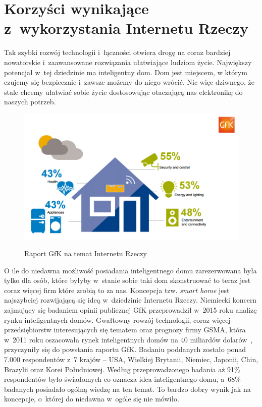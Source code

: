 \documentclass{xmgr}
\begin{document}
\section{Korzyści wynikające z~wykorzystania Internetu Rzeczy}
	Tak szybki rozwój technologii i~łączności otwiera drogę na coraz bardziej nowatorskie i~zaawansowane rozwiązania ułatwiające ludziom życie. Największy potencjał w~tej dziedzinie ma inteligentny dom. Dom jest miejscem, w którym czujemy się bezpiecznie i~zawsze możemy do niego wrócić. Nic więc dziwnego, że stale chcemy ułatwiać sobie życie dostosowując otaczającą nas elektronikę do naszych potrzeb.
\begin{figure}[h]
\centering
\includegraphics[width=\textwidth]{m_percent}
\label{fig:gfk}
\caption{Raport GfK na temat Internetu Rzeczy}
\end{figure} 
	O ile do niedawna możliwość posiadania inteligentnego domu zarezerwowana była tylko dla osób, które byłyby w~stanie sobie taki dom skonstruować to teraz jest coraz więcej firm które zrobią to za nas. Koncepcja tzw. \emph{smart home} jest najszybciej rozwijającą się ideą w~dziedzinie Internetu Rzeczy. Niemiecki koncern zajmujący się badaniem opinii publicznej GfK przeprowadził w~2015 roku analizę rynku inteligentnych domów. Gwałtowny rowzój technologii, coraz więcej przedsiębiorstw interesujących się tematem oraz prognozy firmy GSMA, która w~2011 roku oszacowała rynek inteligentnych domów na 40 miliardów dolarów~\cite{Gsma:2011:CMC}, przyczyniły się do powstania raportu GfK. Badaniu poddanych zostało ponad 7.000 respondentów z~7 krajów – USA, Wielkiej Brytanii, Niemiec, Japonii, Chin, Brazylii oraz Korei Południowej. Według przeprowadzonego badania aż 91\% respondentów było świadomych co oznacza idea inteligentnego domu, a~68\% badanych posiadało ogólną wiedzę na ten temat. To bardzo dobry wynik jak na koncepcje, o~której do niedawna w~ogóle się nie mówiło.
\end{document}
